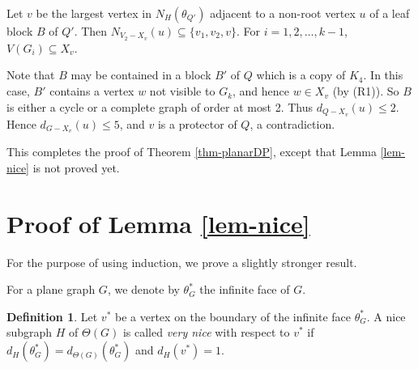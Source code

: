 \documentclass[11pt,a4paper]{article}
\theoremstyle{definition}
\newtheorem{definition}{Definition}
\begin{document}
Let $v$ be the largest vertex in $N_H(\theta_{Q'})$  adjacent to a non-root vertex $u$ of a leaf block $B$ of $Q'$. Then $N_{V_2-X_v}(u) \subseteq \{v_1,v_2, v\}$.  For $i=1,2,\ldots, k-1$, $V(G_i) \subseteq X_v$. 

Note that $B$ may be contained in a block $B'$ of $Q$ which is a copy of $K_4$. In this case, $B'$ contains a vertex $w$ not visible to $G_k$, and hence $w \in X_v$ (by (R1)). So $B$ is either a cycle or a complete graph of order at most 2. 
   Thus $d_{Q-X_v}(u) \le 2$.
Hence $d_{G-X_v}(u) \le 5$, and $v$ is a protector of $Q$, a contradiction.

This completes the proof of Theorem \ref{thm-planarDP}, except that Lemma \ref{lem-nice} is not proved yet.


\section{Proof of Lemma \ref{lem-nice}}

For the purpose of using induction, we prove a slightly stronger result.

For a plane graph $G$,  we denote by $\theta^*_G$ the infinite face of $G$.   

\begin{definition}
    \label{def-verynice}
   Let $v^*$ be a vertex on the boundary of the infinite face $\theta^*_G$. A nice subgraph $H$ of $\Theta(G)$ is called   {\em very nice} with respect to $v^*$  if 
    $d_H(\theta^*_G) = d_{\Theta(G)}(\theta^*_G)$ and $d_H(v^*) =1$.
\end{definition}
\end{document}
